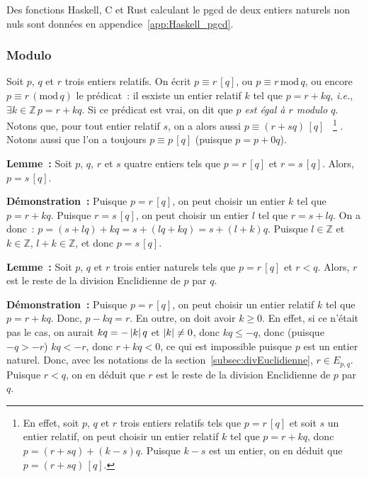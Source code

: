    \done 

\medskip

Des fonctions Haskell, C et Rust calculant le pgcd de deux entiers naturels non nuls sont données en appendice~\ref{app:Haskell_pgcd}. 

\subsubsection{Modulo}

Soit $p$, $q$ et $r$ trois entiers relatifs. 
On écrit $p \equiv r \, [q]$, ou $p \equiv r \, \mathrm{mod} \, q$, ou encore $p \equiv r \, ( \mathrm{mod} \, q)$ le prédicat : il esxiste un entier relatif $k$ tel que $p = r + k q$, \textit{i.e.}, $\exists k \in \mathbb{Z} \, p = r + k q$. 
Si ce prédicat est vrai, on dit que \textit{$p$ est égal à $r$ modulo $q$}.
Notons que, pour tout entier relatif $s$, on a alors aussi $p \equiv (r + s q) \, [q]$%
~\footnote{
    En effet, soit $p$, $q$ et $r$ trois entiers relatifs tels que $p = r \, [q]$ et soit $s$ un entier relatif, on peut choisir un entier relatif $k$ tel que $p = r + k q$, donc $p = (r + s q) + (k - s) q$. 
    Puisque $k-s$ est un entier, on en déduit que $p = (r + s q) \, [q]$.
}%
.
Notons aussi que l'on a toujours $p \equiv p \, [q]$ (puisque $p = p + 0 q$). 

\medskip 

\noindent\textbf{Lemme :} Soit $p$, $q$, $r$ et $s$ quatre entiers tels que $p = r \, [q]$ et $r = s \, [q]$.
    Alors, $p = s \, [q]$.

\medskip 
    
\noindent\textbf{Démonstration :} 
    Puisque $p = r \, [q]$, on peut choisir un entier $k$ tel que $p = r + k q$.
    Puisque $r = s \, [q]$, on peut choisir un entier $l$ tel que $r = s + l q$.
    On a donc : $p = (s + l q) + k q = s + (l q + k q) = s + (l + k) q$.
    Puisque $l \in \mathbb{Z}$ et $k \in \mathbb{Z}$, $l + k \in \mathbb{Z}$, et donc $p = s \, [q]$.

    \done

\medskip 

\noindent\textbf{Lemme :} Soit $p$, $q$ et $r$ trois entier naturels tels que $p = r \, [q]$ et $r < q$.
    Alors, $r$ est le reste de la division Enclidienne de $p$ par $q$.

\medskip 
    
\noindent\textbf{Démonstration :}
    Puisque $p = r \, [q]$, on peut choisir un entier relatif $k$ tel que $p = r + k q$.
    Donc, $p - k q = r$.
    En outre, on doit avoir $k \geq 0$. 
    En effet, si ce n'était pas le cas, on aurait $k q = - \left\lvert k \right\rvert q$ et $\left\lvert k \right\rvert \neq 0$, donc $k q \leq -q$, donc (puisque $-q > -r$) $k q < -r$, donc $r + k q < 0$, ce qui est impossible puisque $p$ est un entier naturel.
    Donc, avec les notations de la section~\ref{subsec:divEuclidienne}, $r \in E_{p,q}$. 
    Puisque $r < q$, on en déduit que $r$ est le reste de la division Enclidienne de $p$ par $q$.

